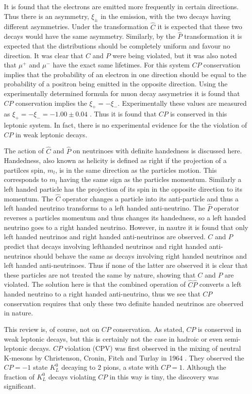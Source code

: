 \noindent It is found that the electrons are emitted more frequently in certain directions. Thus there is an asymmetry, $\xi_{\pm}$ in the emission, with the two decays having different asymmetries. Under the transformation $\hat{C}$ it is expected that these two decays would have the same asymmetry. Similarly, by the $\hat{P}$ transformation it is expected that the distributions should be completely uniform and favour no direction. It was clear that $C$ and $P$ were being violated, but it was also noted that $\mu^{+}$ and $\mu^{-}$ have the exact same lifetimes. For this system $CP$ conservation implies that the probability of an electron in one direction should be equal to the probability of a positron being emitted in the opposite direction. Using the experimentally determined formula for muon decay assymetries it is found that $CP$ conservation implies the $\xi_{+} = - \xi_{-}$. Experimentally these values are measured as $\xi_{+} = - \xi_{-} =  - 1.00 \pm 0.04$ \cite{Martin+Shaw}. Thus it is found that $CP$ is conserved in this leptonic system. In fact, there is no experimental evidence for the the violation of $CP$ in weak leptonic decays.

\noindent The action of $\hat{C}$ and $\hat{P}$ on neutrinoes with definite handedness is discussed here. Handedness, also known as helicity is defined as right if the projection of a partilces spin, $m_{l}$, is in the same direction as the particles motion. This corresponds to $m_{l}$ having the same sign as the particles momentum. Similarly a left handed particle has the projection of its spin in the opposite direction to its momentum. The $\hat{C}$ operator changes a particle into its anti-particle and thus a left handed neutrino transforms to a left handed anti-neutrino. The $\hat{P}$ operator reverses a particles momentum and thus changes its handedness, so a left handed neutrino goes to a right handed neutrino. However, in nautre it is found that only left handed neutrinos and right handed anti-neutrinos are observed. $C$ and $P$ predict that decays involving lefthanded neutrinos and right handed anti-neutrinos should behave the same as decays involving right handed neutrinos and left handed anti-neutrinoes. Thus if none of the latter are observed it is clear that these particles are not treated the same by nature, showing that $C$ and $P$ are violated. The solution here is that the combined operation of $\hat{C}\hat{P}$ converts a left handed neutrino to a right handed anti-neutrino, thus we see that $CP$ conservation requires that only these two definite handed neutrinos are observed in nature.               

This review is, of course, not on $CP$ conservation. As stated, $CP$ is conserved in weak leptonic decays, but this is certainly not the case in hadroic or even semi-leptonic decays. $CP$ violation (CPV) was first observed in the mixing of neutral K-mesons by Christenson, Cronin, Fitch and Turlay in 1964 \cite{FirstCPV}. They observed the $CP = -1$ state $K^{0}_L$ decaying to $2$ pions, a state with $CP = 1$. Although the fraction of $K^{0}_L$ decays violating $CP$ in this way is tiny, the discovery was significant.      
